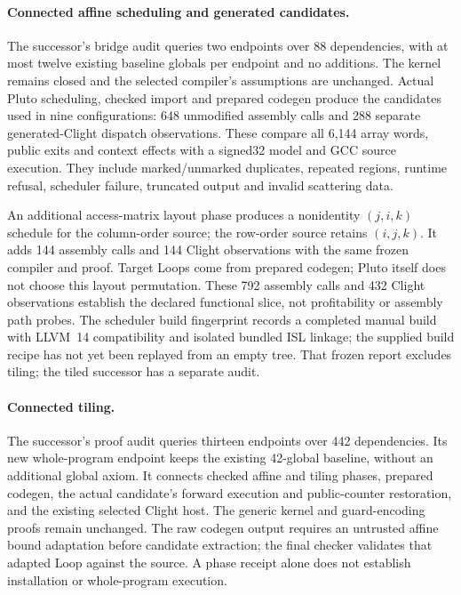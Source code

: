 \paragraph{Connected affine scheduling and generated candidates.}
The successor's bridge audit queries two endpoints over 88 dependencies, with
at most twelve existing baseline globals per endpoint and no additions.
The kernel remains closed and the selected compiler's assumptions are unchanged.
Actual Pluto scheduling, checked import and prepared codegen produce the
candidates used in nine configurations: 648 unmodified assembly calls and 288
separate generated-Clight dispatch observations. These compare all 6,144 array
words, public exits and context effects with a signed32 model and GCC source
execution. They include marked/unmarked duplicates, repeated regions, runtime
refusal, scheduler failure, truncated output and invalid scattering data.

An additional access-matrix layout phase produces a nonidentity $(j,i,k)$
schedule for the column-order source; the row-order source retains $(i,j,k)$.
It adds 144 assembly calls and 144 Clight observations with the same frozen
compiler and proof. Target Loops come from prepared codegen; Pluto itself does
not choose this layout permutation. These 792 assembly calls and 432 Clight
observations establish the declared functional slice, not profitability or
assembly path probes. The scheduler build fingerprint records a completed
manual build with LLVM~14 compatibility and isolated bundled ISL linkage;
the supplied build recipe has not yet been replayed from an empty tree.
That frozen report excludes tiling; the tiled successor has a separate audit.

\paragraph{Connected tiling.}
The successor's proof audit queries thirteen endpoints over 442 dependencies.
Its new whole-program endpoint keeps the existing 42-global baseline, without
an additional global axiom. It connects checked affine and tiling phases,
prepared codegen, the actual candidate's forward execution and public-counter
restoration, and the existing selected Clight host. The generic kernel and
guard-encoding proofs remain unchanged. The raw codegen output requires an
untrusted affine bound adaptation before candidate extraction; the final checker
validates that adapted Loop against the source. A phase receipt alone does not
establish installation or whole-program execution.

